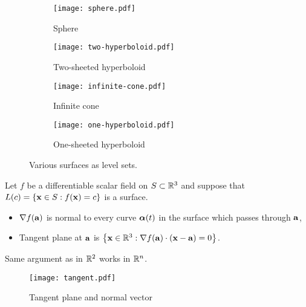 \begin{figure}[htb]
    \begin{center}
        \begin{subfigure}[b]{0.24\textwidth}
            \centering
            \texttt{[image: sphere.pdf]}
            \caption{Sphere}
            \label{fig:sphere}
        \end{subfigure}
        \hfill
        \begin{subfigure}[b]{0.24\textwidth}
            \centering
            \texttt{[image: two-hyperboloid.pdf]}
            \caption{Two-sheeted hyperboloid}
            \label{fig:two-hyperboloid}
        \end{subfigure}
        \hfill
        \begin{subfigure}[b]{0.24\textwidth}
            \centering
            \texttt{[image: infinite-cone.pdf]}
            \caption{Infinite cone}
            \label{fig:infinite-cone}
        \end{subfigure}
        \hfill
        \begin{subfigure}[b]{0.24\textwidth}
            \centering
            \texttt{[image: one-hyperboloid.pdf]}
            \caption{One-sheeted hyperboloid}
            \label{fig:one-hyperboloid}
        \end{subfigure}
        \caption{Various surfaces as level sets.}
        \label{fig:level-sets}
    \end{center}
\end{figure}


Let \(f\) be a differentiable scalar field on \(S\subset \bR^3\) and suppose that \(L(c) = \left\{\xx\in S : f(\xx)=c\right\}\) is a surface.

\begin{itemize}
    \item \(\nabla f(\aa)\) is normal to every curve \(\aalpha(t)\) in the surface which passes through \(\aa\),
    \item Tangent plane at \(\aa\) is
          \(\left\{\xx\in\bR^3: \nabla f(\aa) \cdot (\xx-\aa)=0\right\}\).
\end{itemize}

Same argument as in \(\bR^2\) works in \(\bR^n\).


\begin{figure}
    \centering
    \texttt{[image: tangent.pdf]}
    \caption{Tangent plane and normal vector}
\end{figure}


